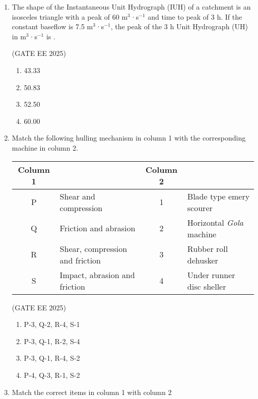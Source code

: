 \documentclass[journal,12pt,onecolumn]{IEEEtran}
\theoremstyle{remark}
\begin{document}
\begin{enumerate}
\item The shape of the Instantaneous Unit Hydrograph (IUH) of a catchment is an isosceles triangle with a peak of 60 m$^{3}$·s$^{-1}$ and time to peak of 3 h. If the constant baseflow is 7.5 m$^{3}$·s$^{-1}$, the peak of the 3 h Unit Hydrograph (UH) in m$^{3}$·s$^{-1}$ is .

\hfill(GATE EE 2025)

\begin{multicols}{4}
\begin{enumerate}
\item 43.33
\item 50.83
\item 52.50
\item 60.00
\end{enumerate}
\end{multicols}

\item Match the following hulling mechanism in column 1 with the corresponding machine in column 2.  

\begin{center}
\begin{tabular}{|c|l|c|l|}
\hline
\textbf{Column 1} & & \textbf{Column 2} & \\ \hline
P & Shear and compression & 1 & Blade type emery scourer \\ \hline
Q & Friction and abrasion & 2 & Horizontal \textit{Gola} machine \\ \hline
R & Shear, compression and friction & 3 & Rubber roll dehusker \\ \hline
S & Impact, abrasion and friction & 4 & Under runner disc sheller \\ \hline
\end{tabular}
\end{center}

\hfill(GATE EE 2025)

\begin{multicols}{2}
\begin{enumerate}
\item P-3, Q-2, R-4, S-1
\item P-3, Q-1, R-2, S-4
\item P-3, Q-1, R-4, S-2
\item P-4, Q-3, R-1, S-2
\end{enumerate}
\end{multicols}

\item Match the correct items in column 1 with column 2


\end{enumerate}
\end{document}
